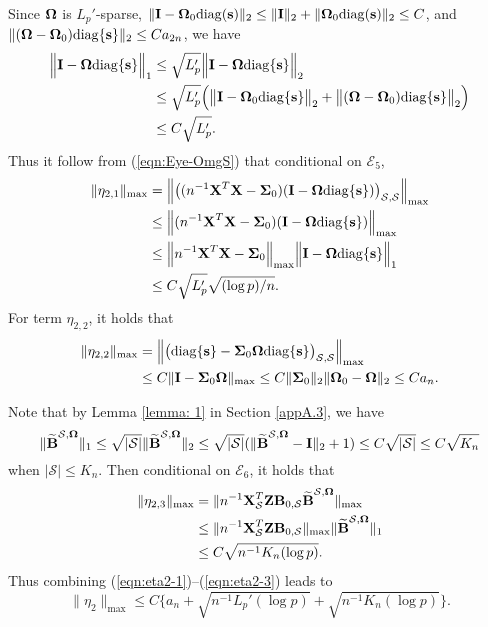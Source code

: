 \documentclass[11pt]{article}
\newcommand{\bs}{\mbox{\bf s}}
\newcommand{\bB}{\mbox{\bf B}}
\newcommand{\bI}{\mbox{\bf I}}
\newcommand{\bX}{\mbox{\bf X}}
\newcommand{\bZ}{\mbox{\bf Z}}
\newcommand{\bSig}{\mbox{\boldmath $\Sigma$}}
\newcommand{\bOmg}{\mbox{\boldmath $\Omega$}}
\newcommand{\sbOmg}{\mbox{\scriptsize\boldmath $\Omega$}}
\newcommand{\diag}{\mathrm{diag}}
\begin{document}
Since $\bOmg$ is $L_p'$-sparse, $\|\bI-\bOmg_{0}\diag(\bs)\|_2\leq \|\bI\|_2 + \|\bOmg_{0}\diag(\bs)\|_2 \leq C$, and $\|(\bOmg - \bOmg_{0}) \diag\{\bs\}\|_2\leq Ca_{2n}$, we have
\begin{align}
\Big\| \bI - \bOmg\diag\{\bs\} \Big\|_{1}
& \le \sqrt{L_{p}'} \Big\| \bI - \bOmg\diag\{\bs\} \Big\|_{2}
\nonumber \\
& \le \sqrt{L_{p}'} \Big(\big\| \bI - \bOmg_{0} \diag\{\bs\} \big\|_{2} +
\big\| (\bOmg - \bOmg_{0}) \diag\{\bs\} \big\|_{2} \Big)
\nonumber \\
& \le C \sqrt{L_{p}'}. \label{eqn:Eye-OmgS}
\end{align}
Thus it follow from (\ref{eqn:Eye-OmgS}) that conditional on $\mathcal{
E}_{5}$,
\begin{align}
\| \eta_{2,1} \|_{\max} & =
\Big\| \big( ( n^{-1} \bX^{T} \bX - \bSig_0 )
( \bI - \bOmg\diag\{\bs\})
\big)_{\mathcal{S},\mathcal{S}} \Big\|_{\max}
\nonumber \\
& \le
\Big\|  ( n^{-1} \bX^{T} \bX - \bSig_0 ) ( \bI - \bOmg\diag\{\bs\}) \Big\|_{\max}
\nonumber \\
& \le
\Big\|  n^{-1} \bX^{T} \bX - \bSig_0  \Big\|_{\max} \Big\| \bI - \bOmg\diag\{\bs\} \Big\|_{1}
\nonumber \\
& \le  C \sqrt{L_{p}'}\sqrt{(\log p)/n}. \label{eqn:eta2-1}
\end{align}
For term $\eta_{2, 2}$, it holds that
\begin{align}
\| \eta_{2,2} \|_{\max} & =
\Big\| \big( \diag\{\bs\} - \bSig_0 \bOmg\diag\{\bs\} \big)_{\mathcal{S},\mathcal{S}} \Big\|_{\max}
\nonumber \\
& \le
C \|  \bI - \bSig_0 \bOmg  \|_{\max}
\le C \| \bSig_0 \|_{2} \|  \bOmg_0 - \bOmg  \|_{2}
\le C a_{n}. \label{eqn:eta2-2}
\end{align}

Note that by Lemma \ref{lemma: 1} in Section \ref{appA.3}, we have
\[ \| \widetilde{\bB}^{\mathcal{S}, \sbOmg} \|_{1}
\le \sqrt{|\mathcal{S}|} \| \widetilde{\bB}^{\mathcal{S}, \sbOmg} \|_{2}
\le \sqrt{|\mathcal{S}|} ( \| \widetilde{\bB}^{\mathcal{S}, \sbOmg} - \bI \|_{2} + 1 )
\le C \sqrt{|\mathcal{S}|}
\le C \sqrt{K_n} \]
when $|\mathcal S| \leq K_n$. Then conditional on $\mathcal{E}_{6}$, it holds that
\begin{align}
\| \eta_{2,3} \|_{\max} & =
\| n^{-1} \bX_{\mathcal S}^{T} \bZ \bB_{0,\mathcal{S}}\widetilde{\bB}^{\mathcal{S}, \sbOmg} \|_{\max}
\nonumber \\
& \le
\| n^{-1} \bX_{\mathcal S}^{T} \bZ \bB_{0,\mathcal{S}} \|_{\max} \| \widetilde{\bB}^{\mathcal{S}, \sbOmg} \|_{1}
\nonumber \\
& \le C  \sqrt{n^{-1}K_n(\log p)}. \label{eqn:eta2-3}
\end{align}
Thus combining (\ref{eqn:eta2-1})--(\ref{eqn:eta2-3}) leads to
\begin{equation} \label{eqn:eta2}
\| \eta_2 \|_{\max} \le C \{a_n +  \sqrt{n^{-1}L_{p}'(\log p)} +  \sqrt{n^{-1}K_n(\log p)}\}.
\end{equation}
\end{document}
